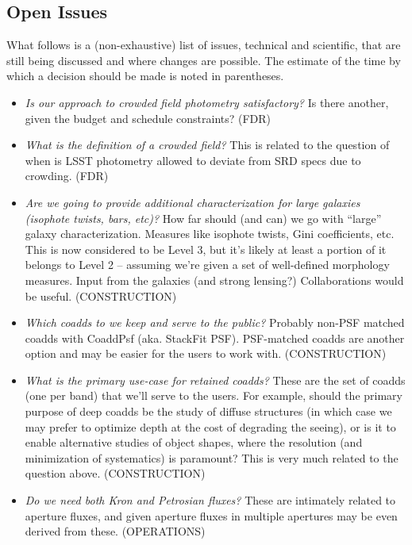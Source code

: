 \documentclass[12pt]{article}
\begin{document}
\begin{openissues}
\subsection{Open Issues}

What follows is a (non-exhaustive) list of issues, technical and scientific, that are still being discussed and where changes are possible. The estimate of the time by which a decision should be made is noted in parentheses.

\begin{itemize}
    \item \emph{Is our approach to crowded field photometry satisfactory?} Is there another, given the budget and schedule constraints? (FDR)

    \item \emph{What is the definition of a crowded field?} This is related to the question of when is LSST photometry allowed to deviate from SRD specs due to crowding. (FDR)

    \item \emph{Are we going to provide additional characterization for large galaxies (isophote twists, bars, etc)?} How far should (and can) we go with ``large'' galaxy characterization. Measures like isophote twists, Gini coefficients, etc. This is now considered to be Level 3, but it's likely at least a portion of it belongs to Level 2 -- assuming we're given a set of well-defined morphology measures. Input from the galaxies (and strong lensing?) Collaborations would be useful. (CONSTRUCTION)

    \item \emph{Which coadds to we keep and serve to the public?} Probably non-PSF matched coadds with CoaddPsf (aka. StackFit PSF). PSF-matched coadds are another option and may be easier for the users to work with. (CONSTRUCTION)

    \item \emph{What is the primary use-case for retained coadds?} These are the set of coadds (one per band) that we'll serve to the users. For example, should the primary purpose of deep coadds be the study of diffuse structures (in which case we may prefer to optimize depth at the cost of degrading the seeing), or is it to enable alternative studies of object shapes, where the resolution (and minimization of systematics) is paramount? This is very much related to the question above. (CONSTRUCTION)

    \item \emph{Do we need both Kron and Petrosian fluxes?} These are intimately related to aperture fluxes, and given aperture fluxes in multiple apertures may be even derived from these. (OPERATIONS)


\end{itemize}
\end{openissues}
\end{document}
